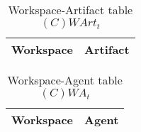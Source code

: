 \begin{table}[H]
	\centering
	\begin{tabular}{|p{4cm}|p{8cm}|}
			\hline
			\textbf{Workspace} & \textbf{Artifact} \\
			\hline
			\hline
		\end{tabular}
	\caption{Workspace-Artifact table $(C)WArt_t$}
	\label{tab:cwartt}
\end{table}

\begin{table}[H]
	\centering
	\begin{tabular}{|p{4cm}|p{8cm}|}
			\hline
			\textbf{Workspace} & \textbf{Agent} \\
			\hline
			\hline
		\end{tabular}
	\caption{Workspace-Agent table $(C)WA_t$}
	\label{tab:cwat}
\end{table}
